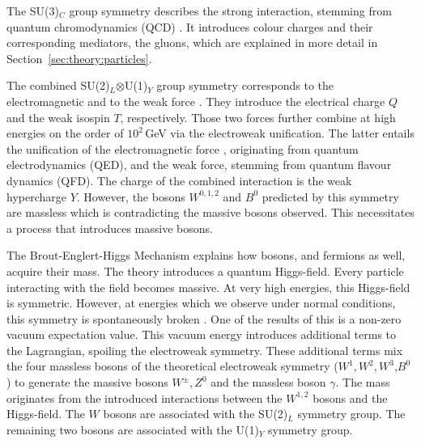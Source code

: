 \documentclass[bachelor,ngerman,english]{GAUBM}
\begin{document}

The SU(3)$_C$ group symmetry describes the strong interaction, stemming from quantum chromodynamics (QCD) \cite{theory:qcd_01,theory:qcd_02,theory:qcd_03,theory:qcd_04,theory:qcd_05}. It introduces colour charges and their corresponding mediators, the gluons, which are explained in more detail in Section~\ref{sec:theory:particles}.

The combined SU(2)$_L$$\otimes$U(1)$_Y$ group symmetry corresponds to the electromagnetic and to the weak force \cite{theory:qed_01,theory:qed_02,theory:qed_03,theory:qed_04,theory:qed_05}. They introduce the electrical charge $Q$ and the weak isospin $T$, respectively. Those two forces further combine at high energies on the order of $10^2$\,GeV via the electroweak unification. The latter entails the unification of the electromagnetic force \cite{theory:qed_01,theory:qed_02,theory:qed_03,theory:qed_04,theory:qed_05,theory:electroweak_01,theory:electroweak_02,theory:electroweak_03}, originating from quantum electrodynamics (QED), and the weak force, stemming from quantum flavour dynamics (QFD). The charge of the combined interaction is the weak hypercharge $Y$. However, the bosons $W^{0,1,2}$ and $B^0$ predicted by this symmetry are massless which is contradicting the massive bosons observed. This necessitates a process that introduces massive bosons. 

The Brout-Englert-Higgs Mechanism \cite{theory:higgs_mechanism_01,theory:higgs_mechanism_02,theory:higgs_mechanism_03} explains how bosons, and fermions as well, acquire their mass. The theory introduces a quantum Higgs-field. Every particle interacting with the field becomes massive. At very high energies, this Higgs-field is symmetric. However, at energies which we observe under normal conditions, this symmetry is spontaneously broken \cite{theory:spontaneous_symmetry_breaking}. One of the results of this is a non-zero vacuum expectation value. This vacuum energy introduces additional terms to the Lagrangian, spoiling the electroweak symmetry. These additional terms mix the four massless bosons of the theoretical electroweak symmetry ($W^1,W^2,W^3$,$B^0$) to generate the massive bosons $W^\pm, Z^0$ and the massless boson $\gamma$. The mass originates from the introduced interactions between the $W^{1,2}$ bosons and the Higgs-field. The $W$ bosons are associated with the SU(2)$_L$ symmetry group. The remaining two bosons are associated with the U(1)$_Y$ symmetry group.
\end{document}
